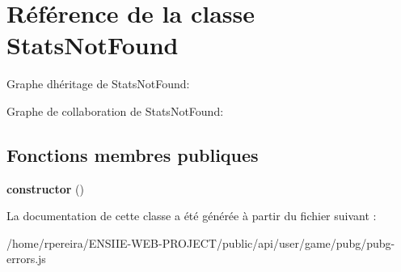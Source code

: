 \hypertarget{classStatsNotFound}{}\section{Référence de la classe Stats\+Not\+Found}
\label{classStatsNotFound}


Graphe d\textquotesingle{}héritage de Stats\+Not\+Found\+:


Graphe de collaboration de Stats\+Not\+Found\+:
\subsection*{Fonctions membres publiques}
\begin{DoxyCompactItemize}
\item 
{\bfseries constructor} ()\hypertarget{classStatsNotFound_a29c88abcb2353fb2b218979097d808ad}{}\label{classStatsNotFound_a29c88abcb2353fb2b218979097d808ad}

\end{DoxyCompactItemize}


La documentation de cette classe a été générée à partir du fichier suivant \+:\begin{DoxyCompactItemize}
\item 
/home/rpereira/\+E\+N\+S\+I\+I\+E-\/\+W\+E\+B-\/\+P\+R\+O\+J\+E\+C\+T/public/api/user/game/pubg/pubg-\/errors.\+js\end{DoxyCompactItemize}
